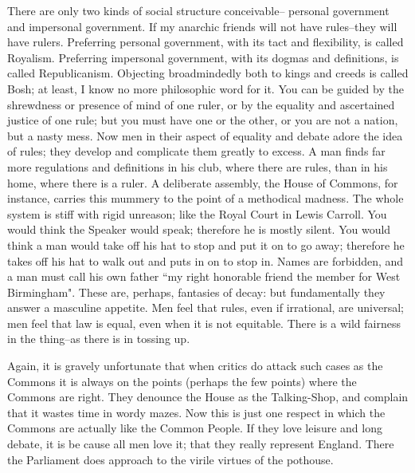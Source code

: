 \documentclass[final,10pt,letterpaper,twocolumn,openany]{book}
\begin{document}
There are only two kinds of social structure conceivable-- personal
government and impersonal government. If my anarchic friends will not
have rules--they will have rulers. Preferring personal government, with its
tact and flexibility, is called Royalism. Preferring impersonal government,
with its dogmas and definitions, is called Republicanism. Objecting
broadmindedly both to kings and creeds is called Bosh; at least, I know no
more philosophic word for it. You can be guided by the shrewdness or
presence of mind of one ruler, or by the equality and ascertained justice of
one rule; but you must have one or the other, or you are not a nation, but a
nasty mess. Now men in their aspect of equality and debate adore the idea
of rules; they develop and complicate them greatly to excess. A man finds
far more regulations and definitions in his club, where there are rules, than
in his home, where there is a ruler. A deliberate assembly, the House of
Commons, for instance, carries this mummery to the point of a methodical
madness. The whole system is stiff with rigid unreason; like the Royal
Court in Lewis Carroll. You would think the Speaker would speak;
therefore he is mostly silent. You would think a man would take off his hat
to stop and put it on to go away; therefore he takes off his hat to walk out
and puts in on to stop in. Names are forbidden, and a man must call his
own father ``my right honorable friend the member for West Birmingham".
These are, perhaps, fantasies of decay: but fundamentally they answer a
masculine appetite. Men feel that rules, even if irrational, are universal;
men feel that law is equal, even when it is not equitable. There is a wild
fairness in the thing--as there is in tossing up.

Again, it is gravely unfortunate that when critics do attack such cases
as the Commons it is always on the points (perhaps the few points) where
the Commons are right. They denounce the House as the Talking-Shop,
and complain that it wastes time in wordy mazes. Now this is just one
respect in which the Commons are actually like the Common People. If
they love leisure and long debate, it is be cause all men love it; that they
really represent England. There the Parliament does approach to the virile
virtues of the pothouse.
\end{document}

